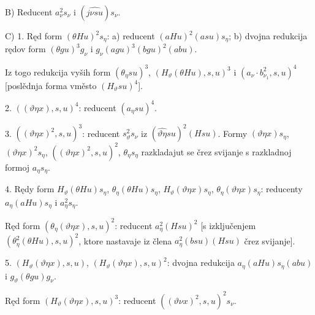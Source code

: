 \documentclass[11pt]{article}
\begin{document}
B) Reducent $a_{\nu}^2s_{\nu}$ i $(\widehat{j\nu su})s_{\nu}$.

C) 1. Ręd form $(\theta Hu)^2s_\eta$: a) reducent $(aHu)^2(asu)s_\eta$; b) dvojna redukcija rędov form $(\theta gu)^3g_{\nu}$ i $g_{\nu}(agu)^3(bgu)^2(abu)$.

Iz togo redukcija vyših form $(\theta_\eta su)^3$, $(H_\vartheta(\theta Hu),s,u)^3$ i $(a_{\nu}\cdot b_{\nu_1}^2,s,u)^4$ [poslědnja forma vměsto $(H_\vartheta su)^4$].

2. $((\vartheta\eta x),s,u)^4$: reducent $(a_\eta su)^4$.

3. $((\vartheta\eta x)^2,s,u)^3$: reducent $s_\vartheta^2s_{\nu}$ iz $(\widehat{\vartheta\eta}su)^2(Hsu)$. Formy $(\vartheta\eta x)s_\eta$, $(\vartheta\eta x)^2s_\eta$, $((\vartheta\eta x)^2,s,u)^2$, $\theta_\eta s_\eta$ razkladajut se črez svijanje s razkladnoj formoj $a_\eta s_\eta$.

4. Rędy form $H_\vartheta(\theta Hu)s_\eta$, $\theta_\eta(\theta Hu)s_\eta$, $H_\vartheta(\vartheta\eta x)s_\eta$, $\theta_\eta(\vartheta\eta x)s_\eta$: reducenty $a_\eta(aHu)s_\eta$ i $a_\eta^2s_\eta$.

Ręd form $(\theta_\eta(\vartheta\eta x),s,u)^2$: reducent $a_\eta^2(Hsu)^2$ [s izključenjem $(\theta_\eta^2(\theta Hu),s,u)^2$, ktore nastavaje iz člena $a_\eta^2(bsu)(Hsu)$ črez svijanje].

5. $(H_\vartheta(\vartheta\eta x),s,u)$, $(H_\vartheta(\vartheta\eta x),s,u)^2$: dvojna redukcija $a_\eta(aHu)s_\eta(abu)$ i $g_\vartheta(\theta gu)g_{\nu}$.

Ręd form $(H_\vartheta(\vartheta\eta x),s,u)^3$: reducent $((\vartheta\nu x)^2,s,u)^2s_{\nu}$.
\end{document}
